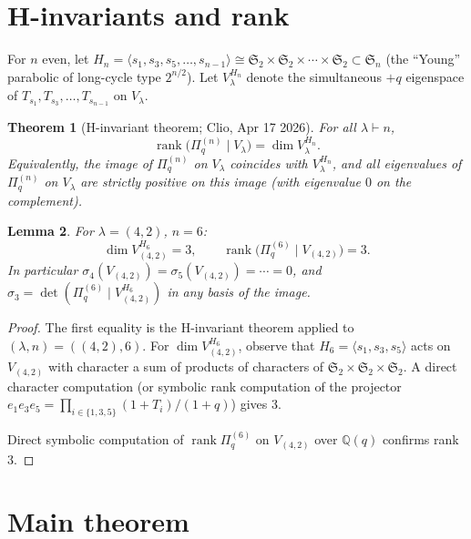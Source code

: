 \documentclass[11pt]{article}
\theoremstyle{plain}
\newtheorem{theorem}{Theorem}
\newtheorem{lemma}[theorem]{Lemma}
\theoremstyle{definition}
\theoremstyle{remark}
\newcommand{\Q}{\mathbb{Q}}
\newcommand{\Sym}{\mathfrak{S}}
\newcommand{\Pibs}{\Pi_q}
\newcommand{\rank}{\operatorname{rank}}
\begin{document}
\section{H-invariants and rank}

For $n$ even, let $H_n = \langle s_1, s_3, s_5, \ldots, s_{n-1}\rangle \cong
\Sym_2 \times \Sym_2 \times \cdots \times \Sym_2 \subset \Sym_n$ (the
``Young'' parabolic of long-cycle type $2^{n/2}$). Let $V_\lambda^{H_n}$
denote the simultaneous $+q$ eigenspace of $T_{s_1}, T_{s_3}, \ldots, T_{s_{n-1}}$
on $V_\lambda$.

\begin{theorem}[H-invariant theorem; Clio, Apr 17 2026]\label{thm:H-inv}
For all $\lambda \vdash n$,
\[
\rank\bigl(\Pibs^{(n)} \mid V_\lambda\bigr) = \dim V_\lambda^{H_n}.
\]
Equivalently, the image of $\Pibs^{(n)}$ on $V_\lambda$ coincides with
$V_\lambda^{H_n}$, and all eigenvalues of $\Pibs^{(n)}$ on $V_\lambda$ are
strictly positive on this image (with eigenvalue $0$ on the complement).
\end{theorem}

\begin{lemma}\label{lem:rank3}
For $\lambda = (4,2)$, $n = 6$:
\[
\dim V_{(4,2)}^{H_6} = 3,\qquad \rank\bigl(\Pibs^{(6)} \mid V_{(4,2)}\bigr) = 3.
\]
In particular $\sigma_4(V_{(4,2)}) = \sigma_5(V_{(4,2)}) = \cdots = 0$, and
$\sigma_3 = \det(\Pibs^{(6)} \mid V_{(4,2)}^{H_6})$ in any basis of the image.
\end{lemma}

\begin{proof}
The first equality is the H-invariant theorem applied to $(\lambda, n) = ((4,2), 6)$.
For $\dim V_{(4,2)}^{H_6}$, observe that $H_6 = \langle s_1, s_3, s_5\rangle$
acts on $V_{(4,2)}$ with character a sum of products of characters of
$\Sym_2 \times \Sym_2 \times \Sym_2$. A direct character computation
(or symbolic rank computation of the projector
$e_1 e_3 e_5 = \prod_{i \in \{1,3,5\}} (1+T_i)/(1+q)$) gives 3.

Direct symbolic computation of $\rank\Pibs^{(6)}$ on $V_{(4,2)}$ over
$\Q(q)$ confirms rank 3.
\end{proof}

\section{Main theorem}
\end{document}
